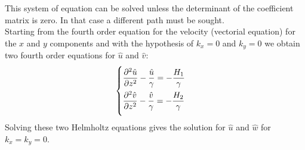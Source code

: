 This system of equation can be solved unless the determinant of the coefficient matrix is zero. In that case a different path must be sought.\\
Starting from the fourth order equation for the velocity (vectorial equation) for the $x$ and $y$ components and with the hypothesis of $k_x=0$ and $k_y=0$ we obtain two fourth order equations for $\hat u$ and $\hat v$:
\begin{equation}
\begin{cases}
\dfrac{\partial^2\hat u}{\partial z^2}-\dfrac{\hat u}{\gamma}=-\dfrac{H_1}{\gamma}\\[2ex]
\dfrac{\partial^2\hat v}{\partial z^2}-\dfrac{\hat v}{\gamma}=-\dfrac{H_2}{\gamma}\\[2ex]
\end{cases}
\end{equation}
Solving these two Helmholtz equations gives the solution for $\hat u$ and $\hat w$ for $k_x=k_y=0$.

